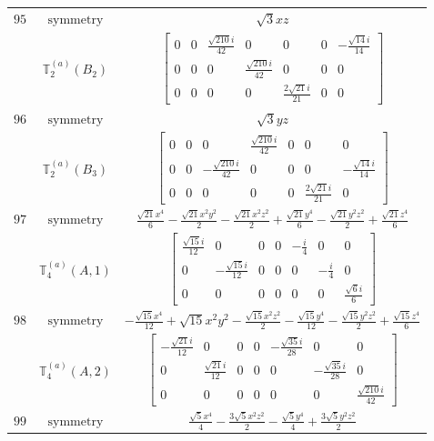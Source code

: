 \documentclass[fleqn,8pt,landscape]{jsarticle}
\begin{document}
\begin{longtable}{ccc}
$ 95 $ & $ \text{symmetry} $ & $ \sqrt{3} x z $ \\
$  $ & $ \mathbb{T}_{2}^{(a)}(B_{2}) $ & $ \begin{bmatrix} 0 & 0 & \frac{\sqrt{210} i}{42} & 0 & 0 & 0 & - \frac{\sqrt{14} i}{14} \\ 0 & 0 & 0 & \frac{\sqrt{210} i}{42} & 0 & 0 & 0 \\ 0 & 0 & 0 & 0 & \frac{2 \sqrt{21} i}{21} & 0 & 0 \end{bmatrix} $ \\ \hline
$ 96 $ & $ \text{symmetry} $ & $ \sqrt{3} y z $ \\
$  $ & $ \mathbb{T}_{2}^{(a)}(B_{3}) $ & $ \begin{bmatrix} 0 & 0 & 0 & \frac{\sqrt{210} i}{42} & 0 & 0 & 0 \\ 0 & 0 & - \frac{\sqrt{210} i}{42} & 0 & 0 & 0 & - \frac{\sqrt{14} i}{14} \\ 0 & 0 & 0 & 0 & 0 & \frac{2 \sqrt{21} i}{21} & 0 \end{bmatrix} $ \\ \hline
$ 97 $ & $ \text{symmetry} $ & $ \frac{\sqrt{21} x^{4}}{6} - \frac{\sqrt{21} x^{2} y^{2}}{2} - \frac{\sqrt{21} x^{2} z^{2}}{2} + \frac{\sqrt{21} y^{4}}{6} - \frac{\sqrt{21} y^{2} z^{2}}{2} + \frac{\sqrt{21} z^{4}}{6} $ \\
$  $ & $ \mathbb{T}_{4}^{(a)}(A,1) $ & $ \begin{bmatrix} \frac{\sqrt{15} i}{12} & 0 & 0 & 0 & - \frac{i}{4} & 0 & 0 \\ 0 & - \frac{\sqrt{15} i}{12} & 0 & 0 & 0 & - \frac{i}{4} & 0 \\ 0 & 0 & 0 & 0 & 0 & 0 & \frac{\sqrt{6} i}{6} \end{bmatrix} $ \\ \hline
$ 98 $ & $ \text{symmetry} $ & $ - \frac{\sqrt{15} x^{4}}{12} + \sqrt{15} x^{2} y^{2} - \frac{\sqrt{15} x^{2} z^{2}}{2} - \frac{\sqrt{15} y^{4}}{12} - \frac{\sqrt{15} y^{2} z^{2}}{2} + \frac{\sqrt{15} z^{4}}{6} $ \\
$  $ & $ \mathbb{T}_{4}^{(a)}(A,2) $ & $ \begin{bmatrix} - \frac{\sqrt{21} i}{12} & 0 & 0 & 0 & - \frac{\sqrt{35} i}{28} & 0 & 0 \\ 0 & \frac{\sqrt{21} i}{12} & 0 & 0 & 0 & - \frac{\sqrt{35} i}{28} & 0 \\ 0 & 0 & 0 & 0 & 0 & 0 & \frac{\sqrt{210} i}{42} \end{bmatrix} $ \\ \hline
$ 99 $ & $ \text{symmetry} $ & $ \frac{\sqrt{5} x^{4}}{4} - \frac{3 \sqrt{5} x^{2} z^{2}}{2} - \frac{\sqrt{5} y^{4}}{4} + \frac{3 \sqrt{5} y^{2} z^{2}}{2} $ \\

\end{longtable}
\end{document}
